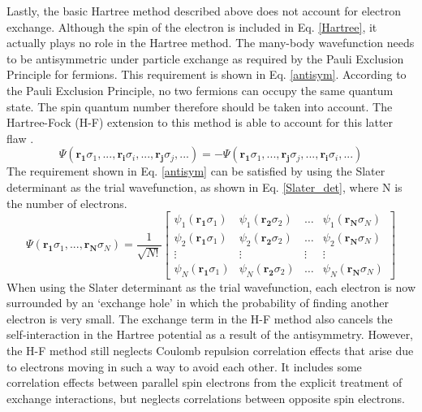 \documentclass[11pt, twoside]{report}
\begin{document}
Lastly, the basic Hartree method described above does not account for electron exchange. Although the spin of the electron is included in Eq. \ref{Hartree}, it actually plays no role in the Hartree method. The many-body wavefunction needs to be antisymmetric under particle exchange as required by the Pauli Exclusion Principle for fermions. This requirement is shown in Eq. \ref{antisym}. According to the Pauli Exclusion Principle, no two fermions can occupy the same quantum state. The spin quantum number therefore should be taken into account. The Hartree-Fock (H-F) extension to this method is able to account for this latter flaw \cite{Prasad_ch2}.
\begin{equation}\label{antisym}
\Psi(\mathbf{r_1}\sigma_1, ..., \mathbf{r_i}\sigma_i, ..., \mathbf{r_j}\sigma_j, ...) = - \Psi(\mathbf{r_1}\sigma_1, ..., \mathbf{r_j}\sigma_j, ..., \mathbf{r_i}\sigma_i, ...)
\end{equation}
The requirement shown in Eq. \ref{antisym} can be satisfied by using the Slater determinant as the trial wavefunction, as shown in Eq. \ref{Slater_det}, where N is the number of electrons.
\begin{equation}\label{Slater_det}
\Psi(\mathbf{r_1}\sigma_1, ..., \mathbf{r_N}\sigma_N) = \frac{1}{\sqrt{N!}} \begin{bmatrix}
\psi_1(\mathbf{r_1}\sigma_1) & \psi_1(\mathbf{r_2}\sigma_2) & \dots & \psi_1(\mathbf{r_N}\sigma_N) \\
\psi_2(\mathbf{r_1}\sigma_1) & \psi_2(\mathbf{r_2}\sigma_2) & \dots & \psi_2(\mathbf{r_N}\sigma_N) \\
\vdots & \vdots & \vdots & \vdots \\
\psi_N(\mathbf{r_1}\sigma_1) & \psi_N(\mathbf{r_2}\sigma_2) & \dots & \psi_N(\mathbf{r_N}\sigma_N) 
\end{bmatrix}
\end{equation}
When using the Slater determinant as the trial wavefunction, each electron is now surrounded by an `exchange hole' in which the probability of finding another electron is very small. The exchange term in the H-F method also cancels the self-interaction in the Hartree potential as a result of the antisymmetry.
However, the H-F method still neglects Coulomb repulsion correlation effects that arise due to electrons moving in such a way to avoid each other. It includes some correlation effects between parallel spin electrons from the explicit treatment of exchange interactions, but neglects correlations between opposite spin electrons. 
\end{document}
